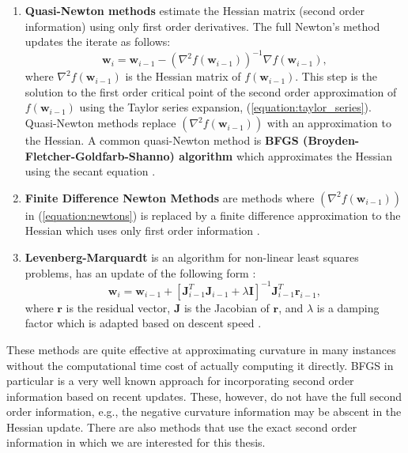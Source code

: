 \documentclass[letterpaper,12pt,titlepage,oneside,final]{book}
\begin{document}
	\begin{enumerate}
		\item{\textbf{Quasi-Newton methods} estimate the Hessian matrix (second order information) using only first order derivatives. The full Newton's method updates the iterate as follows:
			\begin{equation}
			\mathbf{w}_{i} = \mathbf{w}_{i-1} - (\nabla^{2}{f(\mathbf{w}_{i-1})})^{-1}\nabla{f(\mathbf{w}_{i-1})},
			\label{equation:newtons}
			\end{equation}
			where $\nabla^{2}{f(\mathbf{w}_{i-1})}$ is the Hessian matrix of $f(
			\mathbf{w}_{i-1})$. This step is the solution to the first order critical point of the second order approximation of $f(\mathbf{w}_{i-1})$ using the Taylor series expansion, (\ref{equation:taylor_series}). Quasi-Newton methods replace $(\nabla^{2}{f(\mathbf{w}_{i-1})})$ with an approximation to the Hessian. A common quasi-Newton method is \textbf{BFGS (Broyden-Fletcher-Goldfarb-Shanno) algorithm} which approximates the Hessian using the secant equation \cite{Shepherd.1997}.  
		}
		\item{\textbf{Finite Difference Newton Methods} are methods where $(\nabla^{2}{f(\mathbf{w}_{i-1})})$ in (\ref{equation:newtons}) is replaced by a finite difference approximation to the Hessian which uses only first order information \cite{Shepherd.1997}.}
		\item{\textbf{Levenberg-Marquardt} is an algorithm for non-linear least squares problems, has an update of the following form \cite{Shepherd.1997}:
			\begin{equation}
			\mathbf{w}_{i} = \mathbf{w}_{i-1} + [\mathbf{J}^{T}_{i-1}\mathbf{J}^{}_{i-1} + \lambda\mathbf{I}]^{-1}\mathbf{J}^{T}_{i-1}\mathbf{r}_{i-1},
			\end{equation}    
			where $\mathbf{r}$ is the residual vector, $\mathbf{J}$ is the Jacobian of $\mathbf{r}$, and $\lambda$ is a damping factor which is adapted based on descent speed \cite{Shepherd.1997}. }    
	\end{enumerate}
	These methods are quite effective at approximating curvature in many instances without the computational time cost of actually computing it directly. BFGS in particular is a very well known approach for incorporating second order information based on recent updates. These, however, do not have the full second order information, e.g., the negative curvature information may be abscent in the Hessian update. There are also methods that use the exact second order information in which we are interested for this thesis. 
\end{document}
